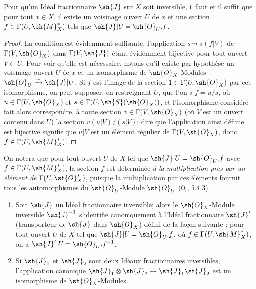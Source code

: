\begin{proposition}[21.2.2]
\label{IV.21.2.2}
Pour qu'un Idéal fractionnaire $\sh{J}$ sur $X$ soit inversible, il faut et il suffit que pour tout $x\in X$, il existe un voisinage ouvert $U$ de $x$ et une section $f\in\Gamma(U,\sh{M}_X^*)$ tels que $\sh{J}|U=\sh{O}_U.f$.
\end{proposition}

\begin{proof}
La condition est évidemment suffisante, l'application $s\leadsto s(f|V)$ de $\Gamma(V,\sh{O}_X)$ dans $\Gamma(V,\sh{J})$ étant évidemment bijective pour tout ouvert $V\subset U$.
Pour voir qu'elle est nécessaire, notons qu'il existe par hypothèse un voisinage ouvert $U$ de $x$ et un isomorphisme de $\sh{O}_X$-Modules $\sh{O}_U\xrightarrow{\sim}\sh{J}|U$.
Si $f$ est l'image de la section $1\in\Gamma(U,\sh{O}_X)$ par cet isomorphisme, on peut supposer, en restreignant $U$, que l'on a $f=u/s$, où $u\in\Gamma(U,\sh{O}_X)$ et $s\in\Gamma(U,\sh{S}(\sh{O}_X))$, et l'isomorphisme considéré fait alors correspondre, à toute section $v\in\Gamma(V,\sh{O}_X)$ (où $V$ est un ouvert contenu dans $U$) la section $v(u|V)/(s|V)$;
dire que l'application ainsi définie est bijective signifie que $u|V$ est un élément régulier de $\Gamma(V,\sh{O}_X)$, donc $f\in\Gamma(U,\sh{M}_X^*)$.
\end{proof}

On notera que pour tout ouvert $U$ de $X$ tel que $\sh{J}|U=\sh{O}_U.f$ avec $f\in\Gamma(U,\sh{M}_X^*)$, la section $f$ est déterminée \emph{à la multiplication près par un élément de} $\Gamma(U,\sh{O}_X^*)$, puisque la
multiplication par ces éléments fournit tous les automorphismes du $\sh{O}_U$-Module $\sh{O}_U$ (\hyperref[0.5.4.3]{$\mathbf{0}_{\mathrm I}$, 5.4.3}).

\begin{corollary}[21.2.3]
\label{IV.21.2.3}
\begin{enumerate}[label=\textup{(\roman*)}]
  \item Soit $\sh{J}$ un Idéal fractionnaire inversible;
  alors le $\sh{O}_X$-Module inversible $\sh{J}^{-1}$ s'identifie canoniquement à l'Idéal fractionnaire $\sh{J}'$ (transporteur de $\sh{J}$ dans $\sh{O}_X$) défini de la façon suivante : pour tout ouvert $U$ de $X$ tel que $\sh{J}|U=\sh{O}_U.f$, où $f\in\Gamma(U,\sh{M}_X^*)$, on a $\sh{J}'|U=\sh{O}_U.f^{-1}$.
  \item Si $\sh{J}_1$ et $\sh{J}_2$ sont deux Idéaux fractionnaires inversibles, l'application canonique $\sh{J}_1\otimes\sh{J}_2\to\sh{J}_1\sh{J}_2$ est un isomorphisme de $\sh{O}_X$-Modules.
\end{enumerate}
\end{corollary}

